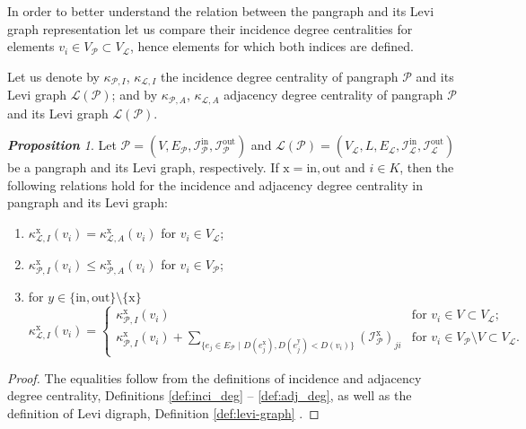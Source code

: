 \documentclass[a4paper,12pt]{article}
\theoremstyle{definition}
\theoremstyle{remark}
\newcommand{\mP}{\mathcal{P}}
\newcommand{\mL}{\mathcal{L}}
\newcommand{\EP}{E_{\mathcal{P}}}
\newcommand{\tin}{\mathrm{in}}
\newcommand{\out}{\mathrm{out}}
\newcommand{\incip}{\mathcal{I}^{\tin}_{\mP}}
\newcommand{\incop}{\mathcal{I}^{\out}_{\mP}}
\newtheorem{prop}{\small\bf Proposition}
\begin{document}
In order to better understand the relation between the pangraph and its Levi graph representation let us compare their incidence degree centralities for elements $v_i\in V_{\mP}\subset V_{\mathcal{L}}$, hence elements for which both indices are defined. 

Let us denote by  $\kappa_{\mP,I}$, $\kappa_{\mL,I}$ the incidence degree centrality of pangraph $\mP$ and its Levi graph $\mL(\mathcal{P})$; and by $\kappa_{\mP,A}$, $\kappa_{\mL,A}$ adjacency degree centrality of pangraph $\mP$ and its Levi graph $\mL(\mathcal{P})$.

\begin{prop}
Let $\mP= (V,\EP, \incip,\incop)$ and  $\mL(\mathcal{P})=(V_{\mathcal{L}},L,E_{\mathcal{L}}, \mathcal{I}^{\textrm{in}}_{\mathcal{L}},\mathcal{I}^{\textrm{out}}_{\mathcal{L}})$ be a pangraph and its Levi graph, respectively. If $\mathrm{x}=\textrm{in},\textrm{out}$ and $i\in K$, then the following relations hold for the incidence and adjacency degree centrality in pangraph and its Levi graph:
\begin{enumerate}
\item $\kappa_{\mL,I}^{\mathrm{x}}(v_i)=\kappa_{\mL,A}^{\mathrm{x}}(v_i)%
$ for $v_i \in  V_{\mathcal{L}}$;
\item $\kappa_{\mP,I}^{\mathrm{x}}(v_i)\leq \kappa_{\mP,A}^{\mathrm{x}}(v_i)$ for $v_i\in V_{\mP}$;

\item for $y\in \{\textrm{in},\textrm{out}\}\setminus\{\textrm{x}\}$
\begin{equation*}
\kappa_{\mL, I}^{\mathrm{x}}(v_i)=\begin{cases}
\kappa_{\mP,I}^{\mathrm{x}}(v_i)&\textrm{for }v_i\in V\subset V_{\mathcal{L}};\\
\kappa_{\mP,I}^{\mathrm{x}}(v_i)+ \sum_{\{e_j\in E_{\mP}\,\,|\,\,D(e_j^{\textrm{x}}),D(e_j^{\textrm{y}})<D(v_i)\}}(\mathcal{I}^{\textrm{x}}_{\mP})_{ji}& \text{for }v_i\in V_{\mP}\setminus V\subset V_{\mathcal{L}}.
\end{cases}
\end{equation*}
\end{enumerate}
\end{prop}

\begin{proof}
The equalities follow from the definitions of incidence and adjacency degree centrality, Definitions \ref{def:inci_deg} -- \ref{def:adj_deg}, as well as the definition of Levi digraph, Definition \ref{def:levi-graph} .
\end{proof}
\end{document}
